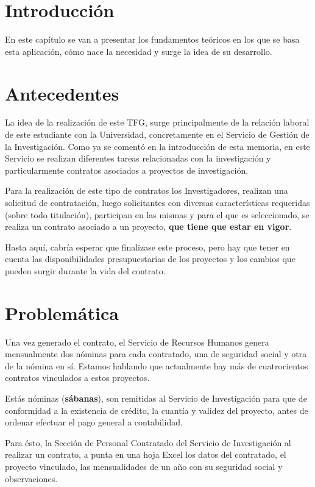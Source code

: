 \section{Introducción}
En este capítulo se van a presentar los fundamentos teóricos en los que se basa esta aplicación, cómo nace la necesidad y surge la idea de su desarrollo.

\section{Antecedentes} 
La idea de la realización de este \acrshort{TFG}, surge principalmente de la relación laboral de este estudiante con la Universidad, concretamente en el Servicio de Gestión de la Investigación. Como ya se comentó en la introducción de esta memoria, en este Servicio se realizan diferentes tareas relacionadas
con la investigación y particularmente contratos asociados a proyectos de investigación.

Para la realización de este tipo de contratos los Investigadores, realizan una solicitud de contratación, luego solicitantes con diversas características
requeridas (sobre todo titulación), participan en las mismas y para el que es seleccionado, se realiza un contrato asociado a un proyecto, \textbf{que tiene que
estar en vigor}. 

Hasta aquí, cabría esperar que finalizase este proceso, pero hay que tener en cuenta las disponibilidades presupuestarias de los proyectos y los cambios que pueden surgir durante la vida del contrato.

\section{Problemática}
Una vez generado el contrato, el Servicio de Recursos Humanos genera mensualmente dos nóminas para cada contratado, una de seguridad social y otra de la nómina en sí. Estamos hablando que actualmente hay más de cuatrocientos contratos vinculados a estos proyectos.

Estás nóminas (\textbf{sábanas}), son remitidas al Servicio de Investigación para que de conformidad a la existencia de crédito, la cuantía y validez del proyecto, antes de ordenar efectuar el pago general a contabilidad.\label{img: sabana}

Para ésto, la Sección de Personal Contratado del Servicio de Investigación al realizar un contrato, a punta en una hoja Excel los datos del contratado, el proyecto vinculado, las mensualidades de un año con su seguridad social y observaciones.\label{img: contrato}

